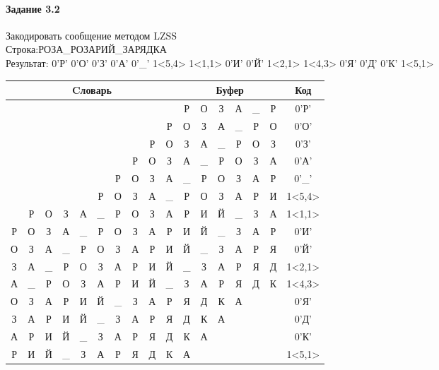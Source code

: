 \documentclass[a4paper, 12pt]{article}
\begin{document}
\paragraph{Задание 3.2}

Закодировать сообщение методом LZSS\\
Строка:РОЗА\_РОЗАРИЙ\_ЗАРЯДКА\\
Результат: 0'Р' 0'О' 0'З' 0'А' 0'\_' 1<5,4> 1<1,1> 0'И' 0'Й' 1<2,1> 1<4,3> 0'Я' 0'Д' 0'К' 1<5,1>\\
\begin{table}[h!]
\centering
\begin{tabular}{|c|c|c|c|c|c|c|c|c|c|c|c|c|c|c|c|c|}
\hline
\multicolumn{10}{|c|}{Cловарь} & \multicolumn{6}{c|}{Буфер} & Код  \\ \hline
  &   &   &   &   &   &   &   &   &   & Р & О & З & А & \_ & Р & 0'Р'\\ \hline
  &   &   &   &   &   &   &   &   & Р & О & З & А & \_ & Р & О & 0'О'\\ \hline
  &   &   &   &   &   &   &   & Р & О & З & А & \_ & Р & О & З & 0'З'\\ \hline
  &   &   &   &   &   &   & Р & О & З & А & \_ & Р & О & З & А & 0'А'\\ \hline
  &   &   &   &   &   & Р & О & З & А & \_ & Р & О & З & А & Р & 0'\_'\\ \hline
  &   &   &   &   & \cellcolor[HTML]{FFFF00} Р & \cellcolor[HTML]{FFFF00} О & \cellcolor[HTML]{FFFF00} З & \cellcolor[HTML]{FFFF00} А & \_ & \cellcolor[HTML]{FFFF00} Р & \cellcolor[HTML]{FFFF00} О & \cellcolor[HTML]{FFFF00} З & \cellcolor[HTML]{FFFF00} А & Р & И & 1<5,4>\\ \hline
  & \cellcolor[HTML]{FFFF00} Р & О & З & А & \_ & Р & О & З & А & \cellcolor[HTML]{FFFF00} Р & И & Й & \_ & З & А & 1<1,1>\\ \hline
Р & О & З & А & \_ & Р & О & З & А & Р & И & Й & \_ & З & А & Р & 0'И'\\ \hline
О & З & А & \_ & Р & О & З & А & Р & И & Й & \_ & З & А & Р & Я & 0'Й'\\ \hline
З & А & \cellcolor[HTML]{FFFF00} \_ & Р & О & З & А & Р & И & Й & \cellcolor[HTML]{FFFF00} \_ & З & А & Р & Я & Д & 1<2,1>\\ \hline
А & \_ & Р & О & \cellcolor[HTML]{FFFF00} З & \cellcolor[HTML]{FFFF00} А & \cellcolor[HTML]{FFFF00} Р & И & Й & \_ & \cellcolor[HTML]{FFFF00} З & \cellcolor[HTML]{FFFF00} А & \cellcolor[HTML]{FFFF00} Р & Я & Д & К & 1<4,3>\\ \hline
О & З & А & Р & И & Й & \_ & З & А & Р & Я & Д & К & А &   &   & 0'Я'\\ \hline
З & А & Р & И & Й & \_ & З & А & Р & Я & Д & К & А &   &   &   & 0'Д'\\ \hline
А & Р & И & Й & \_ & З & А & Р & Я & Д & К & А &   &   &   &   & 0'К'\\ \hline
Р & И & Й & \_ & З & \cellcolor[HTML]{FFFF00} А & Р & Я & Д & К & \cellcolor[HTML]{FFFF00} А &   &   &   &   &   & 1<5,1>\\ \hline
\end{tabular}
\end{table}
\end{document}
